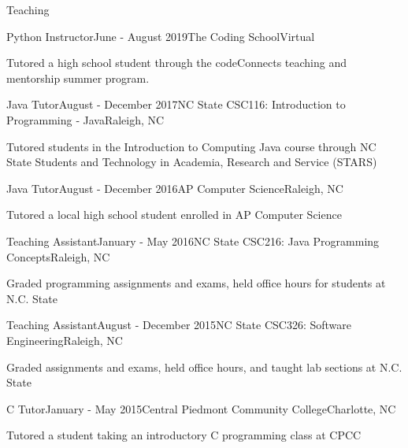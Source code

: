 \documentclass{resume} %
\begin{document}
\begin{rSection}{Teaching}

\begin{rSubsection}{Python Instructor}{June - August 2019}{The Coding School}{Virtual}
\item Tutored a high school student through the codeConnects teaching and mentorship summer program.
\end{rSubsection}


\begin{rSubsection}{Java Tutor}{August - December 2017}{NC State CSC116: Introduction to Programming ‐ Java}{Raleigh, NC}
\item Tutored students in the Introduction to Computing Java course through NC State Students and Technology in Academia, Research and Service (STARS)
\end{rSubsection}

\begin{rSubsection}{Java Tutor}{August - December 2016}{AP Computer Science}{Raleigh, NC}
\item Tutored a local high school student enrolled in AP Computer Science 
\end{rSubsection}


\begin{rSubsection}{Teaching Assistant}{January - May 2016}{NC State CSC216: Java Programming Concepts}{Raleigh, NC}
\item Graded programming assignments and exams, held office hours for students  at N.C. State
\end{rSubsection}


\begin{rSubsection}{Teaching Assistant}{August - December 2015}{NC State CSC326: Software Engineering}{Raleigh, NC}
\item Graded assignments and exams, held office hours, and taught lab sections  at N.C. State
\end{rSubsection}


\begin{rSubsection}{C Tutor}{January - May 2015}{Central Piedmont Community College}{Charlotte, NC}
\item Tutored a student taking an introductory C programming class at CPCC
\end{rSubsection}


\end{rSection}
\end{document}
